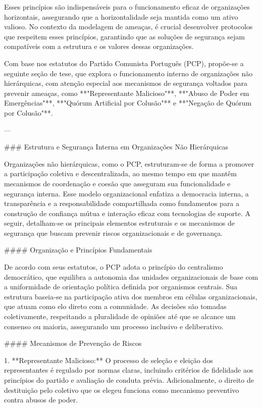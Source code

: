 Esses princípios são indispensáveis para o funcionamento eficaz de organizações horizontais, assegurando que a horizontalidade seja mantida como um ativo valioso. No contexto da modelagem de ameaças, é crucial desenvolver protocolos que respeitem esses princípios, garantindo que as soluções de segurança sejam compatíveis com a estrutura e os valores dessas organizações.

Com base nos estatutos do Partido Comunista Português (PCP), propõe-se a seguinte seção de tese, que explora o funcionamento interno de organizações não hierárquicas, com atenção especial aos mecanismos de segurança voltados para prevenir ameaças, como **"Representante Malicioso"**, **"Abuso de Poder em Emergências"**, **"Quórum Artificial por Colusão"** e **"Negação de Quórum por Colusão"**.

---

### Estrutura e Segurança Interna em Organizações Não Hierárquicas

Organizações não hierárquicas, como o PCP, estruturam-se de forma a promover a participação coletiva e descentralizada, ao mesmo tempo em que mantêm mecanismos de coordenação e coesão que asseguram sua funcionalidade e segurança interna. Esse modelo organizacional enfatiza a democracia interna, a transparência e a responsabilidade compartilhada como fundamentos para a construção de confiança mútua e interação eficaz com tecnologias de suporte. A seguir, detalham-se os principais elementos estruturais e os mecanismos de segurança que buscam prevenir riscos organizacionais e de governança.

#### Organização e Princípios Fundamentais

De acordo com seus estatutos, o PCP adota o princípio do centralismo democrático, que equilibra a autonomia das unidades organizacionais de base com a uniformidade de orientação política definida por organismos centrais. Sua estrutura baseia-se na participação ativa dos membros em células organizacionais, que atuam como elo direto com a comunidade. As decisões são tomadas coletivamente, respeitando a pluralidade de opiniões até que se alcance um consenso ou maioria, assegurando um processo inclusivo e deliberativo.

#### Mecanismos de Prevenção de Riscos

1. **Representante Malicioso:**  
   O processo de seleção e eleição dos representantes é regulado por normas claras, incluindo critérios de fidelidade aos princípios do partido e avaliação de conduta prévia. Adicionalmente, o direito de destituição pelo coletivo que os elegeu funciona como mecanismo preventivo contra abusos de poder.

